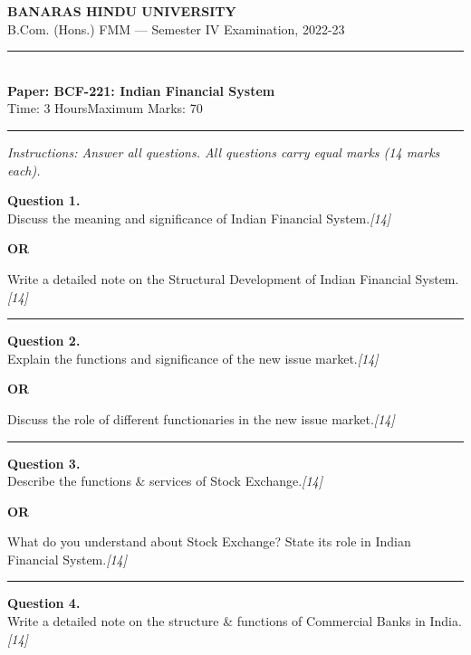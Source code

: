 \documentclass[11pt,a4paper]{article}
\newcommand{\pts}[1]{\hfill   \textit{[#1]}}
\begin{document}
\begin{center}
  {\large\bfseries BANARAS HINDU UNIVERSITY}\\[2pt]
  {\normalsize B.Com. (Hons.) FMM --- Semester IV Examination, 2022-23}\\[6pt]
  \rule{0.8\linewidth}{0.5pt}\\[6pt]
  {\large\bfseries Paper: BCF-221: Indian Financial System}\\[4pt]
  {\normalsize Time: 3 Hours\hfill Maximum Marks: 70}
\end{center}

\rule{\linewidth}{0.4pt}

\smallskip



\noindent   \textit{Instructions: Answer all questions. All questions carry equal marks (14 marks each).}

\bigskip




\noindent   \textbf{Question 1.} \\
Discuss the meaning and significance of Indian Financial System.\pts{14}

\centerline{   \textbf{OR}}

Write a detailed note on the Structural Development of Indian Financial System.\pts{14}

\medskip\rule{\linewidth}{0.2pt}




\noindent   \textbf{Question 2.} \\
Explain the functions and significance of the new issue market.\pts{14}

\centerline{   \textbf{OR}}

Discuss the role of different functionaries in the new issue market.\pts{14}

\medskip\rule{\linewidth}{0.2pt}




\noindent   \textbf{Question 3.} \\
Describe the functions \& services of Stock Exchange.\pts{14}

\centerline{   \textbf{OR}}

What do you understand about Stock Exchange? State its role in Indian Financial System.\pts{14}

\medskip\rule{\linewidth}{0.2pt}




\noindent   \textbf{Question 4.} \\
Write a detailed note on the structure \& functions of Commercial Banks in India.\pts{14}
\end{document}
